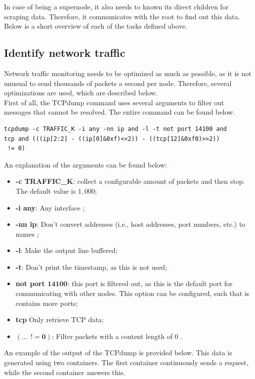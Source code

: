 \noindent
In case of being a supernode, it also needs to known its direct children for scraping data. Therefore, it communicates with the root to find out this data. Below is a short overview of each of the tasks defined above.

\subsection{Identify network traffic} \label{sec:identify-traffic}
Network traffic monitoring needs to be optimized as much as possible, as it is not unusual to send thousands of packets a second per node. Therefore, several optimizations are used, which are described below.\\

\noindent
First of all, the TCPdump command uses several arguments to filter out messages that cannot be resolved. The entire command can be found below.
\begin{verbatim}
tcpdump -c TRAFFIC_K -i any -nn ip and -l -t not port 14100 and
tcp and (((ip[2:2] - ((ip[0]&0xf)<<2)) - ((tcp[12]&0xf0)>>2))
 != 0)
\end{verbatim}
An explanation of the arguments can be found below:
\begin{itemize}
    \item \textbf{-c TRAFFIC\_K}: collect a configurable amount of packets and then stop. The default value is $1,000$;
    \item \textbf{-i any}: Any interface \cite{tcpmanpage};
    \item \textbf{-nn ip}: Don't convert addresses (i.e., host addresses, port numbers, etc.) to names \cite{tcpmanpage};
    \item \textbf{-l}: Make the output line buffered;
    \item \textbf{-t}: Don't print the timestamp, as this is not used;
    \item \textbf{not port $\bm{14100}$}: this port is filtered out, as this is the default port for communicating with other nodes. This option can be configured, such that is contains more ports;
    \item \textbf{tcp} Only retrieve TCP data;
    \item \textbf{$(\dots~~!= \bm{0})$}: Filter packets with a content length of $0$ \cite{tcpdump-filter}.
\end{itemize}
An example of the output of the TCPdump is provided below. This data is generated using two containers. The first container continuously sends a request, while the second container answers this.
